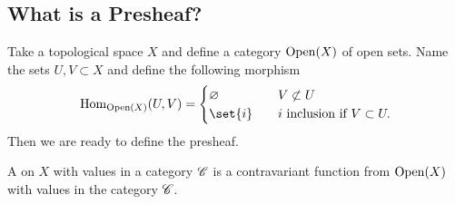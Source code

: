 \subsection{What is a Presheaf?}
Take a topological space $X$ and define a category $\operatorname{Open}(X)$ of open sets. Name the sets $U,V \subset X$ and define the following morphism
\begin{align*}
	\Hom_{\Open(X)}(U,V) = \begin{cases}
		\emptyset &\quad V \not\subset U\\
		\set{i} &\quad i \text{ inclusion if } V \subset U.
	\end{cases}
\end{align*}
Then we are ready to define the presheaf.
\begin{definition}[Presheaf]
	A  on $X$ with values in a category $\mathscr C$ is a contravariant function from $\operatorname{Open}(X)$ with values in the category $\mathscr C$.
\end{definition}